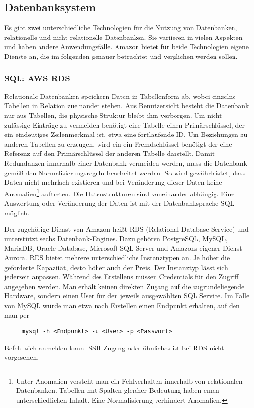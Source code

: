 \subsection{Datenbanksystem}
Es gibt zwei unterschiedliche Technologien für die Nutzung von Datenbanken, relationelle und nicht relationelle Datenbanken.
Sie variieren in vielen Aspekten und haben andere Anwendungsfälle.
Amazon bietet für beide Technologien eigene Dienste an, die im folgenden genauer betrachtet und verglichen werden sollen.

\subsubsection{SQL: AWS RDS}

Relationale Datenbanken speichern Daten in Tabellenform ab, wobei einzelne Tabellen in Relation zueinander stehen.
Aus Benutzersicht besteht die Datenbank nur aus Tabellen, die physische Struktur bleibt ihm verborgen.
Um nicht zulässige Einträge zu vermeiden benötigt eine Tabelle einen Primärschlüssel, der ein eindeutiges Zeilenmerkmal ist, etwa eine
fortlaufende ID. Um Beziehungen zu anderen Tabellen zu erzeugen, wird ein ein Fremdschlüssel benötigt der eine Referenz auf den Primärschlüssel der anderen Tabelle darstellt.
Damit Redundanzen innerhalb einer Datenbank vermeiden werden, muss die Datenbank gemäß den Normalisierungsregeln bearbeitet werden. So wird gewährleistet, dass Daten nicht mehrfach existieren
und bei Veränderung dieser Daten keine Anomalien\footnote{Unter Anomalien versteht man ein Fehlverhalten innerhalb von relationalen Datenbanken. Tabellen
mit Spalten gleicher Bedeutung haben einen unterschiedlichen Inhalt. Eine Normalisierung verhindert Anomalien. } auftreten.
Die Datenstrukturen sind voneinander abhängig. Eine Auswertung oder Veränderung der Daten ist mit der Datenbanksprache SQL möglich. \cite[]{Datenbankvergleich}

Der zugehörige Dienst von Amazon heißt RDS (Relational Database Service) und unterstützt sechs Datenbank-Engines. Dazu gehören
PostgreSQL, MySQL, MariaDB, Oracle Database, Microsoft SQL-Server und Amazons eigener Dienst Aurora.
RDS bietet mehrere unterschiedliche Instanztypen an. Je höher die geforderte Kapazität, desto höher auch der Preis.
Der Instanztyp lässt sich jederzeit anpassen. Während des Erstellens müssen Credentials für den Zugriff angegeben werden. Man erhält keinen
direkten Zugang auf die zugrundeliegende Hardware, sondern einen User für den jeweils ausgewählten SQL Service. Im Falle von MySQL würde man etwa nach Erstellen
einen Endpunkt erhalten, auf den man per
\begin{lstlisting}
     mysql -h <Endpunkt> -u <User> -p <Passwort>
    \end{lstlisting} Befehl sich anmelden kann. SSH-Zugang oder ähnliches ist bei RDS nicht vorgesehen.

